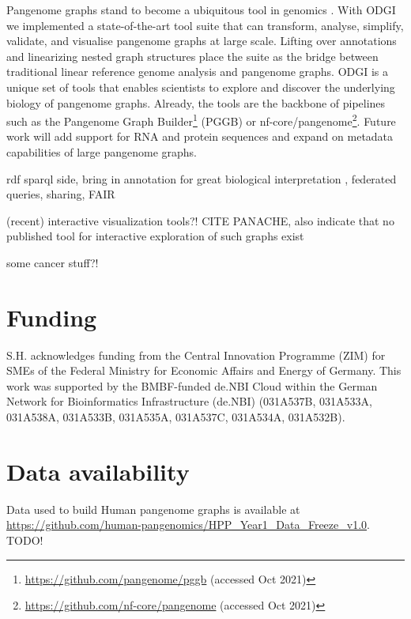 \documentclass{bioinfo}
\begin{document}
Pangenome graphs stand to become a ubiquitous tool in genomics \citep{Eizenga_2020}. With ODGI we implemented a state-of-the-art tool suite that can transform, analyse, simplify, validate, and visualise pangenome graphs at large scale. Lifting over annotations and linearizing nested graph structures place the suite as the bridge between traditional linear reference genome analysis and pangenome graphs. ODGI is a unique set of tools that enables scientists to explore and discover the underlying biology of pangenome graphs. Already, the tools are the backbone of pipelines such as the Pangenome Graph Builder\footnote{\url{https://github.com/pangenome/pggb} (accessed Oct 2021)} (PGGB) or nf-core/pangenome\footnote{\url{https://github.com/nf-core/pangenome} (accessed Oct 2021)}. Future work will add support for RNA and protein sequences and expand on metadata capabilities of large pangenome graphs.

rdf sparql side, bring in annotation for great biological interpretation \cite{Yokoyama2020}, federated queries, sharing, FAIR

(recent) interactive visualization tools?! CITE PANACHE, also indicate that no published tool for interactive exploration of such graphs exist

some cancer stuff?!

\section*{Funding}

S.H. acknowledges funding from the Central Innovation Programme (ZIM) for SMEs of the Federal Ministry for Economic Affairs and Energy of Germany.
This work was supported by the BMBF-funded de.NBI Cloud within the German Network for Bioinformatics Infrastructure (de.NBI) (031A537B, 031A533A, 031A538A, 031A533B, 031A535A, 031A537C, 031A534A, 031A532B).

\section*{Data availability}

Data used to build Human pangenome graphs is available at \url{https://github.com/human-pangenomics/HPP_Year1_Data_Freeze_v1.0}.
TODO!


%
%
%
%
%
%
%

\end{document}
